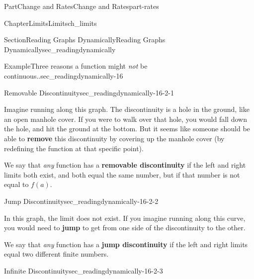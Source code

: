 \documentclass[oneside,10pt,]{tufte-book}
\newcommand{\terminology}[1]{\textbf{#1}}
\numberwithin{equation}{chapter}
\begin{document}
\begin{partptx}{Part}{Change and Rates}{}{Change and Rates}{}{}{part-rates}
\begin{chapterptx}{Chapter}{Limits}{}{Limits}{}{}{ch_limits}
\begin{sectionptx}{Section}{Reading Graphs Dynamically}{}{Reading Graphs Dynamically}{}{}{sec_readingdynamically}
\begin{example}{Example}{Three reasons  a function might \emph{not} be continuous..}{sec_readingdynamically-16}%
%
\begin{descriptionlist}
\begin{dlimedium}{Removable Discontinuity}{sec_readingdynamically-16-2-1}%
\begin{image}{0.25}{0.5}{0.25}{}%
%
\end{image}%
 Imagine running along this graph. The discontinuity is a hole in the ground, like an open manhole cover. If you were to walk over that hole, you would fall down the hole, and hit the ground at the bottom. But it seems like someone should be able to \terminology{remove} this discontinuity by covering up the manhole cover (by redefining the function at that specific point).%
\par
We say that \emph{any} function has a \terminology{removable discontinuity} if the left and right limits both exist, and both equal the same number, but if that number is not equal to \(f(a)\).%
\end{dlimedium}%
\begin{dlimedium}{Jump Discontinuity}{sec_readingdynamically-16-2-2}%
\begin{image}{0.25}{0.5}{0.25}{}%
%
\end{image}%
 In this graph, the limit does not exist.  If you imagine running along this curve, you would need to \terminology{jump} to get from one side of the discontinuity to the other.%
\par
We say that \emph{any} function has a \terminology{jump discontinuity} if the left and right limits equal two different finite numbers.%
\end{dlimedium}%
\begin{dlimedium}{Infinite Discontinuity}{sec_readingdynamically-16-2-3}%

\end{dlimedium}
\end{descriptionlist}
\end{example}
\end{sectionptx}
\end{chapterptx}
\end{partptx}
\end{document}
